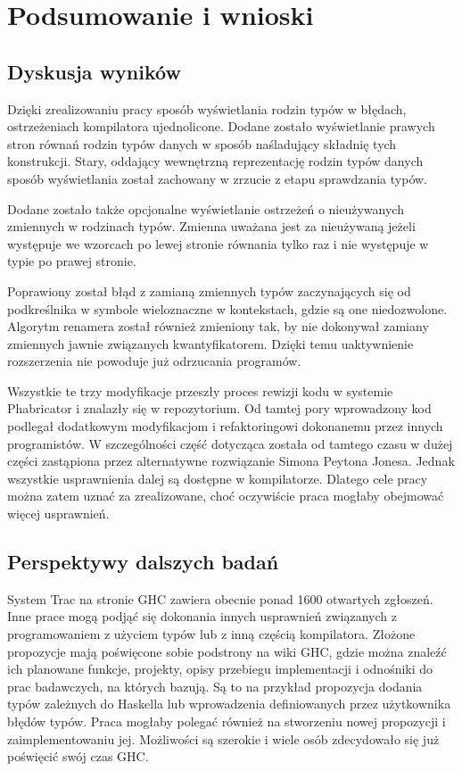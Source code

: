 \chapter{Podsumowanie i wnioski}\label{chap:podsumowanie}

\section{Dyskusja wyników}

Dzięki zrealizowaniu pracy sposób wyświetlania rodzin typów w błędach, ostrzeżeniach kompilatora ujednolicone. Dodane zostało wyświetlanie prawych stron równań rodzin typów danych w sposób naśladujący składnię tych konstrukcji. Stary, oddający wewnętrzną reprezentację rodzin typów danych sposób wyświetlania został zachowany w zrzucie z etapu sprawdzania typów.

Dodane zostało także opcjonalne wyświetlanie ostrzeżeń o nieużywanych zmiennych w rodzinach typów. Zmienna uważana jest za nieużywaną jeżeli występuje we wzorcach po lewej stronie równania tylko raz i nie występuje w typie po prawej stronie.

Poprawiony został błąd z zamianą zmiennych typów zaczynających się od podkreślnika w symbole wieloznaczne w kontekstach, gdzie są one niedozwolone. Algorytm renamera został również zmieniony tak, by nie dokonywał zamiany zmiennych jawnie związanych kwantyfikatorem. Dzięki temu uaktywnienie rozszerzenia  nie powoduje już odrzucania programów.

Wszystkie te trzy modyfikacje przeszły proces rewizji kodu w systemie Phabricator i znalazły się w repozytorium. Od tamtej pory wprowadzony kod podlegał dodatkowym modyfikacjom i refaktoringowi dokonanemu przez innych programistów. W szczególności część dotycząca  została od tamtego czasu w dużej części zastąpiona przez alternatywne rozwiązanie Simona Peytona Jonesa. Jednak wszystkie usprawnienia dalej są dostępne w kompilatorze. Dlatego cele pracy można zatem uznać za zrealizowane, choć oczywiście praca mogłaby obejmować więcej usprawnień.

\section{Perspektywy dalszych badań}
System Trac na stronie GHC zawiera obecnie ponad 1600 otwartych zgłoszeń\cite{WikiTickets}. Inne prace mogą podjąć się dokonania innych usprawnień związanych z programowaniem z użyciem typów lub z inną częścią kompilatora. Złożone propozycje mają poświęcone sobie podstrony na wiki GHC, gdzie można znaleźć ich planowane funkcje, projekty, opisy przebiegu implementacji i odnośniki do prac badawczych, na których bazują. Są to na przykład propozycja dodania typów zależnych do Haskella lub wprowadzenia definiowanych przez użytkownika błędów typów. Praca mogłaby polegać również na stworzeniu nowej propozycji i zaimplementowaniu jej. Możliwości są szerokie i wiele osób zdecydowało się już poświęcić swój czas GHC.

